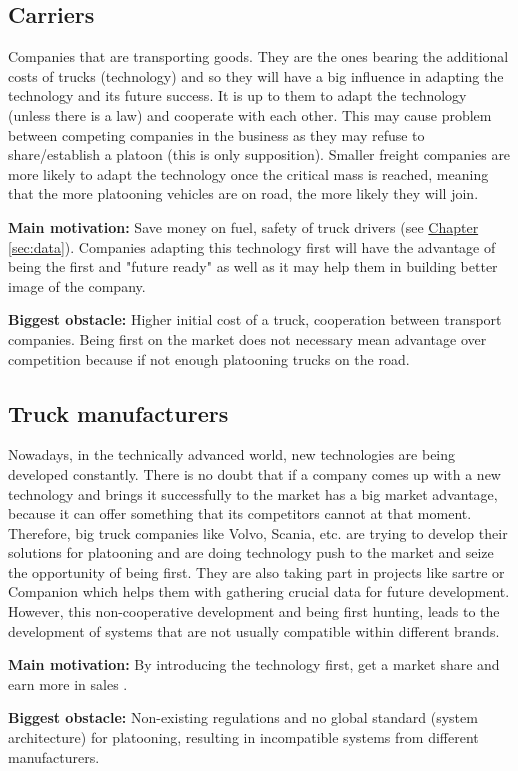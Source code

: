 \subsection{Carriers}
Companies that are transporting goods. They are the ones bearing the additional costs of trucks (technology) and so they will have a big influence in adapting the technology and its future success. It is up to them to adapt the technology (unless there is a law) and cooperate with each other. This may cause problem between competing companies in the business as they may refuse to share/establish a platoon (this is only supposition). Smaller freight companies are more likely to adapt the technology once the critical mass is reached, meaning that the more platooning vehicles are on road, the more likely they will join.
% 
\par \textbf{Main motivation:} Save money on fuel, safety of truck drivers (see \hyperref[sec:data]{Chapter} \ref{sec:data}). Companies adapting this technology first will have the advantage of being the first and "future ready" as well as it may help them in building better image of the company. 
% 
\par \textbf{Biggest obstacle:} Higher initial cost of a truck, cooperation between transport companies. Being first on the market does not necessary mean advantage over competition because if not enough platooning trucks on the road.
% 
\subsection{Truck manufacturers}
Nowadays, in the technically advanced world, new technologies are being developed constantly. There is no doubt that if a company comes up with a new technology and brings it successfully to the market has a big market advantage, because it can offer something that its competitors cannot at that moment. Therefore, big truck companies like Volvo, Scania, etc. are trying to develop their solutions for platooning and are doing technology push to the market and seize the opportunity of being first. They are also taking part in projects like \acrshort{sartre} \cite{Chan2012ProjectSARTRE} or Companion \cite{2016CompanionProject} which helps them with gathering crucial data for future development. However, this non-cooperative development and being first hunting, leads to the development of systems that are not usually compatible within different brands.\par
% 
\par \textbf{Main motivation:} By introducing the technology first, get a market share and earn more in sales \cite{Banbury1995TheSurvival}.\par
% 
\par \textbf{Biggest obstacle:} Non-existing regulations and no global standard (system architecture) for platooning, resulting in incompatible systems from different manufacturers.\par
% 
